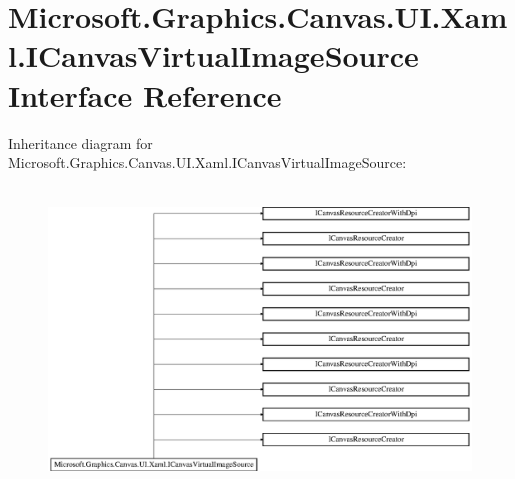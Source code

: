 \hypertarget{interface_microsoft_1_1_graphics_1_1_canvas_1_1_u_i_1_1_xaml_1_1_i_canvas_virtual_image_source}{}\section{Microsoft.\+Graphics.\+Canvas.\+U\+I.\+Xaml.\+I\+Canvas\+Virtual\+Image\+Source Interface Reference}
\label{interface_microsoft_1_1_graphics_1_1_canvas_1_1_u_i_1_1_xaml_1_1_i_canvas_virtual_image_source}
Inheritance diagram for Microsoft.\+Graphics.\+Canvas.\+U\+I.\+Xaml.\+I\+Canvas\+Virtual\+Image\+Source\+:\begin{figure}[H]
\begin{center}
\leavevmode
\includegraphics[height=8.041776cm]{interface_microsoft_1_1_graphics_1_1_canvas_1_1_u_i_1_1_xaml_1_1_i_canvas_virtual_image_source}
\end{center}
\end{figure}
